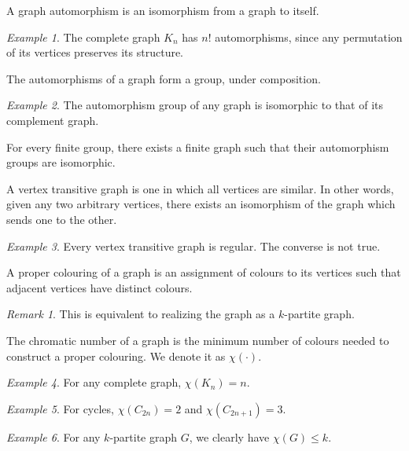 \documentclass[11pt]{article}
\theoremstyle{definition}
\theoremstyle{remark}
\newtheorem*{remark}{Remark}
\newtheorem*{example}{Example}
\numberwithin{equation}{section}
\begin{document}
    \begin{definition}
        A graph automorphism is an isomorphism from a graph to itself.
    \end{definition}
    \begin{example}
        The complete graph $K_n$ has $n!$ automorphisms, since any permutation of its
        vertices preserves its structure.
    \end{example}

    \begin{lemma}
        The automorphisms of a graph form a group, under composition.
    \end{lemma}
    \begin{example}
        The automorphism group of any graph is isomorphic to that of its complement
        graph.
    \end{example}

    \begin{theorem}[Frucht]
        For every finite group, there exists a finite graph such that their
        automorphism groups are isomorphic.
    \end{theorem}

    \begin{definition}
        A vertex transitive graph is one in which all vertices are similar. In other
        words, given any two arbitrary vertices, there exists an isomorphism of the
        graph which sends one to the other.
    \end{definition}
    \begin{example}
        Every vertex transitive graph is regular. The converse is not true.
    \end{example}


    \begin{definition}
        A proper colouring of a graph is an assignment of colours to its vertices
        such that adjacent vertices have distinct colours.
        \begin{remark}
            This is equivalent to realizing the graph as a $k$-partite graph.
        \end{remark}
    \end{definition}

    \begin{definition}
        The chromatic number of a graph is the minimum number of colours needed to
        construct a proper colouring. We denote it as $\chi(\cdot)$.
    \end{definition}
    \begin{example}
        For any complete graph, $\chi(K_n) = n$.
    \end{example}
    \begin{example}
        For cycles, $\chi(C_{2n}) = 2$ and $\chi(C_{2n + 1}) = 3$.
    \end{example}
    \begin{example}
        For any $k$-partite graph $G$, we clearly have $\chi(G) \leq k$.
    \end{example}
\end{document}
